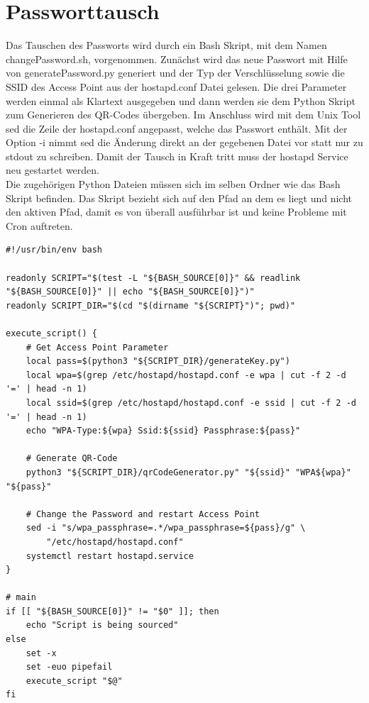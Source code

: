 \documentclass[a4paper,11pt,singlespacing]{article}
\begin{document}
    	
    	\section{Passworttausch}
    		Das Tauschen des Passworts wird durch ein Bash Skript, mit dem Namen changePassword.sh, vorgenommen. Zunächst wird das neue Passwort mit Hilfe von generatePassword.py generiert und der Typ der Verschlüsselung sowie die SSID des Access Point aus der hostapd.conf Datei gelesen. Die drei Parameter werden einmal als Klartext ausgegeben und dann werden sie dem Python Skript zum Generieren des QR-Codes übergeben. Im Anschluss wird mit dem Unix Tool sed die Zeile der hostapd.conf angepasst, welche das Passwort enthält. Mit der Option -i nimmt sed die Änderung direkt an der gegebenen Datei vor statt nur zu stdout zu schreiben. Damit der Tausch in Kraft tritt muss der hostapd Service neu gestartet werden. \\ 
    		Die zugehörigen Python Dateien müssen sich im selben Ordner wie das Bash Skript befinden. Das Skript bezieht sich auf den Pfad an dem es liegt und nicht den aktiven Pfad, damit es von überall ausführbar ist und keine Probleme mit Cron auftreten.  \\
    	\begin{lstlisting}
#!/usr/bin/env bash

readonly SCRIPT="$(test -L "${BASH_SOURCE[0]}" && readlink "${BASH_SOURCE[0]}" || echo "${BASH_SOURCE[0]}")"
readonly SCRIPT_DIR="$(cd "$(dirname "${SCRIPT}")"; pwd)"

execute_script() {
	# Get Access Point Parameter
	local pass=$(python3 "${SCRIPT_DIR}/generateKey.py")         
	local wpa=$(grep /etc/hostapd/hostapd.conf -e wpa | cut -f 2 -d '=' | head -n 1)
	local ssid=$(grep /etc/hostapd/hostapd.conf -e ssid | cut -f 2 -d '=' | head -n 1)
	echo "WPA-Type:${wpa} Ssid:${ssid} Passphrase:${pass}" 

	# Generate QR-Code
	python3 "${SCRIPT_DIR}/qrCodeGenerator.py" "${ssid}" "WPA${wpa}" "${pass}"

	# Change the Password and restart Access Point
	sed -i "s/wpa_passphrase=.*/wpa_passphrase=${pass}/g" \
		"/etc/hostapd/hostapd.conf"
	systemctl restart hostapd.service
}

# main
if [[ "${BASH_SOURCE[0]}" != "$0" ]]; then
	echo "Script is being sourced"
else
	set -x
	set -euo pipefail
	execute_script "$@"
fi  	
    	\end{lstlisting}
\end{document}
